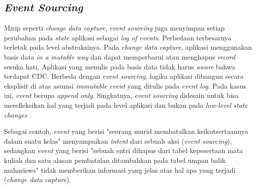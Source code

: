 \subsection{\textit{Event Sourcing}}

Mirip seperti \textit{change data capture}, \textit{event sourcing} juga menyimpan setiap perubahan pada \textit{state} aplikasi sebagai \textit{log of events}. Perbedaan terbesarnya terletak pada level abstraksinya. Pada \textit{change data capture}, aplikasi menggunakan basis data \textit{in a mutable way} dan dapat memperbarui atau menghapus \textit{record} sesuka hati. Aplikasi yang menulis pada basis data tidak harus \textit{aware} bahwa terdapat CDC. Berbeda dengan \textit{event sourcing}, logika aplikasi dibangun secara eksplisit di atas asumsi \textit{immutable event} yang ditulis pada \textit{event log}. Pada kasus ini, \textit{event} berupa \textit{append only}. Singkatnya, \textit{event sourcing} didesain untuk bisa merefleksikan hal yang terjadi pada level aplikasi dan bukan pada \textit{low-level state changes} \parencite{dataIntensiveApplications}.

Sebagai contoh, \textit{event} yang berisi "seorang murid membatalkan keikutsertaannya dalam suatu kelas" menyampaikan \textit{intent} dari sebuah aksi (\textit{event sourcing}), sedangkan \textit{event} yang berisi "sebuah entri dihapus dari tabel kepesertaan mata kuliah dan satu alasan pembatalan ditambahkan pada tabel umpan balik mahasiswa" tidak memberikan informasi yang jelas atas hal apa yang terjadi (\textit{change data capture}).